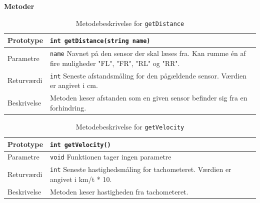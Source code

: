 \textbf{Metoder}

\begin{table}[h]
	\begin{tabularx}{\textwidth}{| L{2.5 cm} | Z |} \hline
	Prototype 	& \texttt{int getDistance(string name)} \\\hline
	Parametre 	& \texttt{name} \newline Navnet på den sensor der skal læses fra. Kan rumme én af fire muligheder "FL", "FR", "RL" og "RR". \\\hline
	Returværdi 	& \texttt{int} \newline Seneste afstandsmåling for den pågældende sensor. Værdien er angivet i cm. \\\hline
	Beskrivelse & Metoden læser afstanden som en given sensor befinder sig fra en forhindring. \\\hline
	\end{tabularx}
	\caption{Metodebeskrivelse for \texttt{getDistance}}
	\label{table:met_getdistance}
\end{table}

\begin{table}[h]
	\begin{tabularx}{\textwidth}{| L{2.5 cm} | Z |} \hline
	Prototype 	& \texttt{int getVelocity()} \\\hline
	Parametre 	& \texttt{void} \newline Funktionen tager ingen parametre \\\hline
	Returværdi 	& \texttt{int} \newline Seneste hastighedsmåling for tachometeret. Værdien er angivet i km/t * 10. \\\hline
	Beskrivelse & Metoden læser hastigheden fra tachometeret. \\\hline
	\end{tabularx}
	\caption{Metodebeskrivelse for \texttt{getVelocity}}
	\label{table:met_velocity}
\end{table}
\clearpage